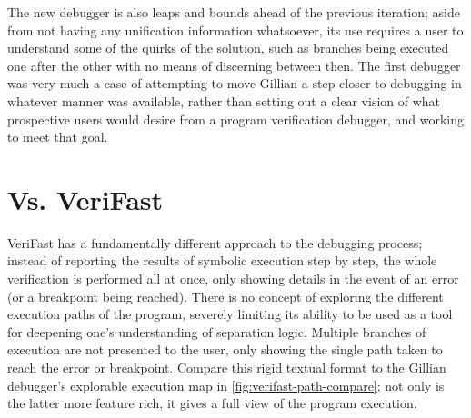 The new debugger is also leaps and bounds ahead of the previous iteration;
aside from not having any unification information whatsoever, its use requires
a user to understand some of the quirks of the solution, such as branches
being executed one after the other with no means of discerning between then.
The first debugger was very much a case of attempting to move Gillian a step
closer to debugging in whatever manner was available, rather than setting out a
clear vision of what prospective users would desire from a program verification
debugger, and working to meet that goal.


\section{Vs. VeriFast}

VeriFast has a fundamentally different approach to the debugging process;
instead of reporting the results of symbolic execution step by step, the whole
verification is performed all at once, only showing details in the event of an
error (or a breakpoint being reached). There is no concept of exploring the
different execution paths of the program, severely limiting its ability to be
used as a tool for deepening one's understanding of separation logic. Multiple
branches of execution are not presented to the user, only showing the single
path taken to reach the error or breakpoint. Compare this rigid textual format
to the Gillian debugger's explorable execution map in
\autoref{fig:verifast-path-compare}; not only is the latter more feature rich,
it gives a full view of the program execution.

